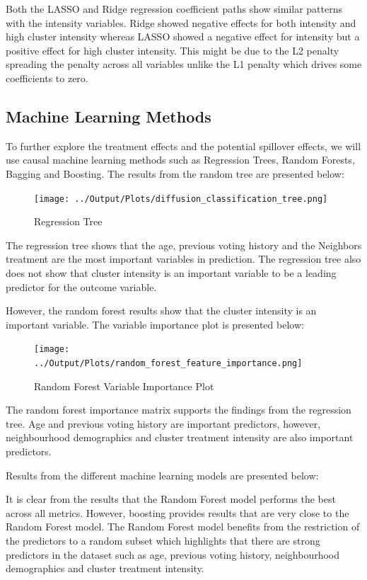 \documentclass[11pt, draft]{article}
\begin{document}
Both the LASSO and Ridge regression coefficient paths show similar patterns with the intensity variables. Ridge showed negative effects for both intensity and high cluster intensity whereas LASSO showed a negative effect for intensity but a positive effect for high cluster intensity. This might be due to the L2 penalty spreading the penalty across all variables unlike the L1 penalty which drives some coefficients to zero.

\subsection{Machine Learning Methods}
To further explore the treatment effects and the potential spillover effects, we will use causal machine learning methods such as Regression Trees, Random Forests, Bagging and Boosting. The results from the random tree are presented below:
\begin{figure}[H]
    \centering
    \texttt{[image: ../Output/Plots/diffusion\_classification\_tree.png]}   
    \caption{Regression Tree}
    \label{fig:regression_tree}
\end{figure}
The regression tree shows that the age, previous voting history and the Neighbors treatment are the most important variables in prediction. The regression tree also does not show that cluster intensity is an important variable to be a leading predictor for the outcome variable.

However, the random forest results show that the cluster intensity is an important variable. The variable importance plot is presented below:
\begin{figure}[H]
    \centering
    \texttt{[image: ../Output/Plots/random\_forest\_feature\_importance.png]}   
    \caption{Random Forest Variable Importance Plot}
    \label{fig:random_forest}
\end{figure}
The random forest importance matrix supports the findings from the regression tree. Age and previous voting history are important predictors, however, neighbourhood demographics and cluster treatment intensity are also important predictors.

Results from the different machine learning models are presented below:


It is clear from the results that the Random Forest model performs the best across all metrics. However, boosting provides results that are very close to the Random Forest model. The Random Forest model benefits from the restriction of the predictors to a random subset which highlights that there are strong predictors in the dataset such as age, previous voting history, neighbourhood demographics and cluster treatment intensity.
\end{document}
